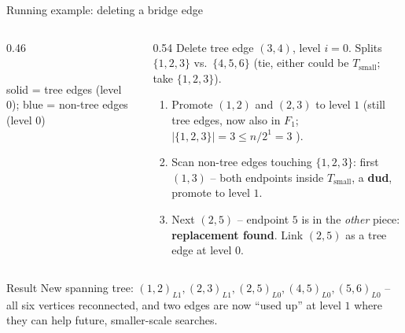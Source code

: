 \documentclass[11pt,aspectratio=169]{beamer}
\begin{document}
\begin{frame}{Running example: deleting a bridge edge}
  \begin{columns}
  \begin{column}{0.46\textwidth}
  \begin{center}
  \\[4pt]
  {\scriptsize solid = tree edges (level 0); blue = non-tree edges (level 0)}
  \end{center}
  \end{column}
  \begin{column}{0.54\textwidth}
  \small
  Delete tree edge $(3,4)$, level $i=0$. Splits $\{1,2,3\}$ vs.\ $\{4,5,6\}$ (tie,
  either could be $T_\text{small}$; take $\{1,2,3\}$).
  \begin{enumerate}
    \item Promote $(1,2)$ and $(2,3)$ to level $1$ (still tree edges, now also in
    $F_1$; $|\{1,2,3\}| = 3 \le n/2^1 = 3$ \checkmark).
    \item Scan non-tree edges touching $\{1,2,3\}$: first $(1,3)$ -- both endpoints
    inside $T_\text{small}$, a \textbf{dud}, promote to level $1$.
    \item Next $(2,5)$ -- endpoint $5$ is in the \emph{other} piece: \textbf{replacement
    found}. Link $(2,5)$ as a tree edge at level $0$.
  \end{enumerate}
  \end{column}
  \end{columns}
  \vspace{4pt}
  \begin{exampleblock}{Result}
    New spanning tree: $(1,2)_{L1}, (2,3)_{L1}, (2,5)_{L0}, (4,5)_{L0}, (5,6)_{L0}$ --
    all six vertices reconnected, and two edges are now ``used up'' at level $1$ where
    they can help future, smaller-scale searches.
  \end{exampleblock}
\end{frame}
\end{document}
